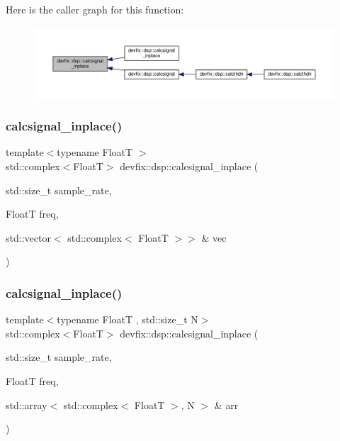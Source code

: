 Here is the caller graph for this function\+:
\nopagebreak
\begin{figure}[H]
\begin{center}
\leavevmode
\includegraphics[width=350pt]{namespacedevfix_1_1dsp_a38dc66c795b9ebe6e8408d95c7a006c9_icgraph}
\end{center}
\end{figure}
\mbox{\label{namespacedevfix_1_1dsp_af2bf29501002d08830f1a7ac3ff22289}} 
\subsubsection{\texorpdfstring{calcsignal\+\_\+inplace()}{calcsignal\_inplace()}\hspace{0.1cm}{\footnotesize\ttfamily [2/3]}}
{\footnotesize\ttfamily template$<$typename FloatT $>$ \\
std\+::complex$<$FloatT$>$ devfix\+::dsp\+::calcsignal\+\_\+inplace (\begin{DoxyParamCaption}\item[{std\+::size\+\_\+t}]{sample\+\_\+rate,  }\item[{FloatT}]{freq,  }\item[{std\+::vector$<$ std\+::complex$<$ FloatT $>$$>$ \&}]{vec }\end{DoxyParamCaption})}

\mbox{\label{namespacedevfix_1_1dsp_ab4671999093ac0b52a1f3fdce063750d}} 
\subsubsection{\texorpdfstring{calcsignal\+\_\+inplace()}{calcsignal\_inplace()}\hspace{0.1cm}{\footnotesize\ttfamily [3/3]}}
{\footnotesize\ttfamily template$<$typename FloatT , std\+::size\+\_\+t N$>$ \\
std\+::complex$<$FloatT$>$ devfix\+::dsp\+::calcsignal\+\_\+inplace (\begin{DoxyParamCaption}\item[{std\+::size\+\_\+t}]{sample\+\_\+rate,  }\item[{FloatT}]{freq,  }\item[{std\+::array$<$ std\+::complex$<$ FloatT $>$, N $>$ \&}]{arr }\end{DoxyParamCaption})}

